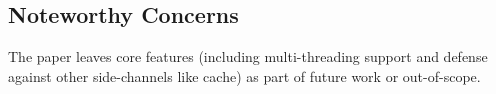 \subsection{Noteworthy Concerns} %
The paper leaves core features (including multi-threading support and defense against other side-channels like cache) as part of future work or out-of-scope.
